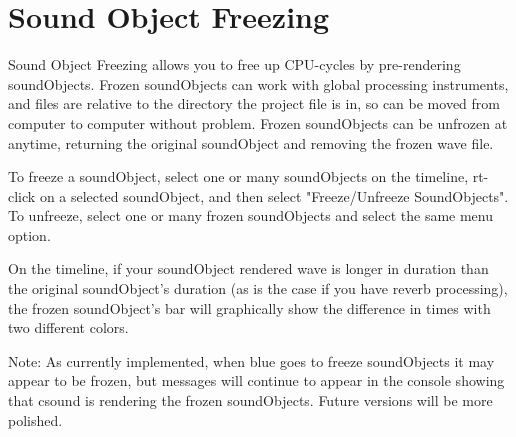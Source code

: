 \section{Sound Object Freezing}\label{soundObjectFreezing}

Sound Object Freezing allows you to free up CPU-cycles by pre-rendering
soundObjects. Frozen soundObjects can work with global processing
instruments, and files are relative to the directory the project file is
in, so can be moved from computer to computer without problem. Frozen
soundObjects can be unfrozen at anytime, returning the original
soundObject and removing the frozen wave file.

To freeze a soundObject, select one or many soundObjects on the
timeline, rt-click on a selected soundObject, and then select
"Freeze/Unfreeze SoundObjects". To unfreeze, select one or many frozen
soundObjects and select the same menu option.

On the timeline, if your soundObject rendered wave is longer in duration
than the original soundObject's duration (as is the case if you have
reverb processing), the frozen soundObject's bar will graphically show
the difference in times with two different colors.

Note: As currently implemented, when blue goes to freeze soundObjects it
may appear to be frozen, but messages will continue to appear in the
console showing that csound is rendering the frozen soundObjects. Future
versions will be more polished.

